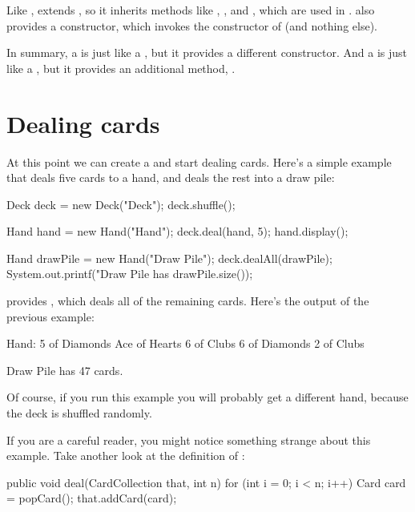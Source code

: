 Like ,  extends , so it inherits methods like , , and , which are used in .
 also provides a constructor, which invokes the constructor of  (and nothing else).

In summary, a  is just like a , but it provides a different constructor.
And a  is just like a , but it provides an additional method, .


\section{Dealing cards}

At this point we can create a  and start dealing cards.
Here's a simple example that deals five cards to a hand, and deals the rest into a draw pile:

\begin{code}
Deck deck = new Deck("Deck");
deck.shuffle();

Hand hand = new Hand("Hand");
deck.deal(hand, 5);
hand.display();
\end{code}

\begin{code}
Hand drawPile = new Hand("Draw Pile");
deck.dealAll(drawPile);
System.out.printf("Draw Pile has %
                  drawPile.size());
\end{code}

 provides , which deals all of the remaining cards.
Here's the output of the previous example:

\begin{stdout}
Hand:
5 of Diamonds
Ace of Hearts
6 of Clubs
6 of Diamonds
2 of Clubs

Draw Pile has 47 cards.
\end{stdout}

Of course, if you run this example you will probably get a different hand, because the deck is shuffled randomly.

If you are a careful reader, you might notice something strange about this example.
Take another look at the definition of :

\begin{code}
public void deal(CardCollection that, int n) {
    for (int i = 0; i < n; i++) {
        Card card = popCard();
        that.addCard(card);
    }
}
\end{code}

